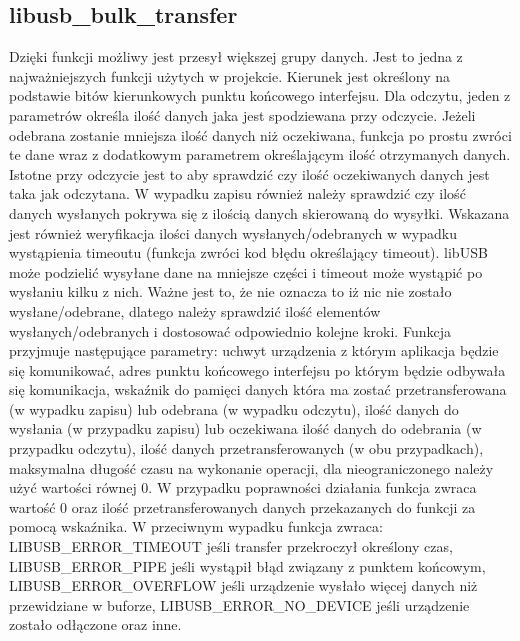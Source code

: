 \documentclass{BscUS}
\begin{document}
\subsection{libusb\_bulk\_transfer}
\noindent Dzięki funkcji możliwy jest przesył większej grupy danych. Jest to jedna z najważniejszych funkcji użytych w projekcie.
Kierunek jest określony na podstawie bitów kierunkowych punktu końcowego interfejsu.
Dla odczytu, jeden z parametrów określa ilość danych jaka jest spodziewana przy odczycie. Jeżeli odebrana zostanie mniejsza ilość danych niż oczekiwana, funkcja po prostu zwróci te dane wraz z dodatkowym parametrem określającym ilość otrzymanych danych. Istotne przy odczycie jest to aby sprawdzić czy ilość oczekiwanych danych jest taka jak odczytana.
W wypadku zapisu również należy sprawdzić czy ilość danych wysłanych pokrywa się z ilością danych skierowaną do wysyłki.
Wskazana jest również weryfikacja ilości danych wysłanych/odebranych w wypadku wystąpienia timeoutu (funkcja zwróci kod błędu określający timeout). libUSB może podzielić wysyłane dane na mniejsze części i timeout może wystąpić po wysłaniu kilku z nich. Ważne jest to, że nie oznacza to iż nic nie zostało wysłane/odebrane, dlatego należy sprawdzić ilość elementów wysłanych/odebranych i dostosować odpowiednio kolejne kroki.
Funkcja przyjmuje następujące parametry: uchwyt urządzenia z którym aplikacja będzie się komunikować, adres punktu końcowego interfejsu po którym będzie odbywała się komunikacja, wskaźnik do pamięci danych która ma zostać przetransferowana (w wypadku zapisu) lub odebrana (w wypadku odczytu), ilość danych do wysłania (w przypadku zapisu) lub oczekiwana ilość danych do odebrania (w przypadku odczytu), ilość danych przetransferowanych (w obu przypadkach), maksymalna długość czasu na wykonanie operacji, dla nieograniczonego należy użyć wartości równej 0.
W przypadku poprawności działania funkcja zwraca wartość 0 oraz ilość przetransferowanych danych przekazanych do funkcji za pomocą wskaźnika.
W przeciwnym wypadku funkcja zwraca: LIBUSB\_ERROR\_TIMEOUT jeśli transfer przekroczył określony czas, LIBUSB\_ERROR\_PIPE jeśli wystąpił błąd związany z punktem końcowym, LIBUSB\_ERROR\_OVERFLOW jeśli urządzenie wysłało więcej danych niż przewidziane w buforze, LIBUSB\_ERROR\_NO\_DEVICE jeśli urządzenie zostało odłączone oraz inne.
\end{document}

